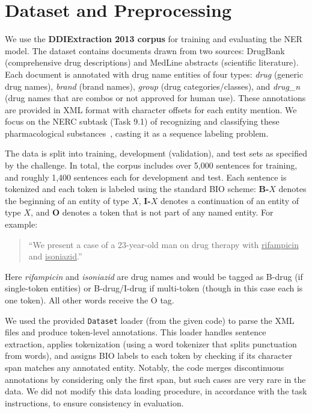 \section{Dataset and Preprocessing}
We use the \textbf{DDIExtraction 2013 corpus} for training and evaluating the NER model. The dataset contains documents drawn from two sources: DrugBank (comprehensive drug descriptions) and MedLine abstracts (scientific literature). Each document is annotated with drug name entities of four types: \textit{drug} (generic drug names), \textit{brand} (brand names), \textit{group} (drug categories/classes), and \textit{drug\_n} (drug names that are combos or not approved for human use). These annotations are provided in XML format with character offsets for each entity mention. We focus on the NERC subtask (Task 9.1) of recognizing and classifying these pharmacological substances~\cite{semeval2013}, casting it as a sequence labeling problem.

The data is split into training, development (validation), and test sets as specified by the challenge. In total, the corpus includes over 5,000 sentences for training, and roughly 1,400 sentences each for development and test. Each sentence is tokenized and each token is labeled using the standard BIO scheme: \textbf{B-}$X$ denotes the beginning of an entity of type $X$, \textbf{I-}$X$ denotes a continuation of an entity of type $X$, and \textbf{O} denotes a token that is not part of any named entity. For example:

\begin{quote}
\small
``We present a case of a 23-year-old man on drug therapy with \underline{rifampicin} and \underline{isoniazid}.'' 
\end{quote}

Here \emph{rifampicin} and \emph{isoniazid} are drug names and would be tagged as B-drug (if single-token entities) or B-drug/I-drug if multi-token (though in this case each is one token). All other words receive the O tag.

We used the provided \texttt{Dataset} loader (from the given code) to parse the XML files and produce token-level annotations. This loader handles sentence extraction, applies tokenization (using a word tokenizer that splits punctuation from words), and assigns BIO labels to each token by checking if its character span matches any annotated entity. Notably, the code merges discontinuous annotations by considering only the first span, but such cases are very rare in the data. We did not modify this data loading procedure, in accordance with the task instructions, to ensure consistency in evaluation.

